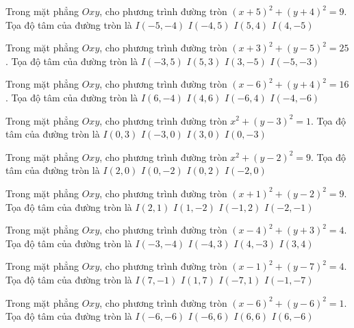 \begin{ex}
Trong mặt phẳng $Oxy$, cho phương trình đường tròn $(x + 5)^2  + (y + 4)^2 = 9$. Tọa độ tâm của đường tròn là
\choice
{ \True $I(-5, -4)$ }
{ $I(-4, 5)$ }
{ $I(5, 4)$ }
{ $I(4, -5)$ }
\end{ex}

\begin{ex}
Trong mặt phẳng $Oxy$, cho phương trình đường tròn $(x + 3)^2  + (y -5)^2 = 25$. Tọa độ tâm của đường tròn là
\choice
{ \True $I(-3, 5)$ }
{ $I(5, 3)$ }
{ $I(3, -5)$ }
{ $I(-5, -3)$ }
\end{ex}

\begin{ex}
Trong mặt phẳng $Oxy$, cho phương trình đường tròn $(x -6)^2   + (y + 4)^2 = 16$. Tọa độ tâm của đường tròn là
\choice
{ \True $I(6, -4)$ }
{ $I(4, 6)$ }
{ $I(-6, 4)$ }
{ $I(-4, -6)$ }
\end{ex}

\begin{ex}
Trong mặt phẳng $Oxy$, cho phương trình đường tròn $x^2 + (y -3)^2 = 1$. Tọa độ tâm của đường tròn là
\choice
{ \True $I(0, 3)$ }
{ $I(-3, 0)$ }
{ $I(3, 0)$ }
{ $I(0, -3)$ }
\end{ex}

\begin{ex}
Trong mặt phẳng $Oxy$, cho phương trình đường tròn $x^2 + (y -2)^2 = 9$. Tọa độ tâm của đường tròn là
\choice
{ $I(2, 0)$ }
{ $I(0, -2)$ }
{ \True $I(0, 2)$ }
{ $I(-2, 0)$ }
\end{ex}

\begin{ex}
Trong mặt phẳng $Oxy$, cho phương trình đường tròn $(x + 1)^2  + (y -2)^2 = 9$. Tọa độ tâm của đường tròn là
\choice
{ $I(2, 1)$ }
{ $I(1, -2)$ }
{ \True $I(-1, 2)$ }
{ $I(-2, -1)$ }
\end{ex}

\begin{ex}
Trong mặt phẳng $Oxy$, cho phương trình đường tròn $(x -4)^2   + (y + 3)^2 = 4$. Tọa độ tâm của đường tròn là
\choice
{ $I(-3, -4)$ }
{ $I(-4, 3)$ }
{ \True $I(4, -3)$ }
{ $I(3, 4)$ }
\end{ex}

\begin{ex}
Trong mặt phẳng $Oxy$, cho phương trình đường tròn $(x -1)^2   + (y -7)^2 = 4$. Tọa độ tâm của đường tròn là
\choice
{ $I(7, -1)$ }
{ \True $I(1, 7)$ }
{ $I(-7, 1)$ }
{ $I(-1, -7)$ }
\end{ex}

\begin{ex}
Trong mặt phẳng $Oxy$, cho phương trình đường tròn $(x -6)^2   + (y -6)^2 = 1$. Tọa độ tâm của đường tròn là
\choice
{ $I(-6, -6)$ }
{ $I(-6, 6)$ }
{ \True $I(6, 6)$ }
{ $I(6, -6)$ }
\end{ex}

